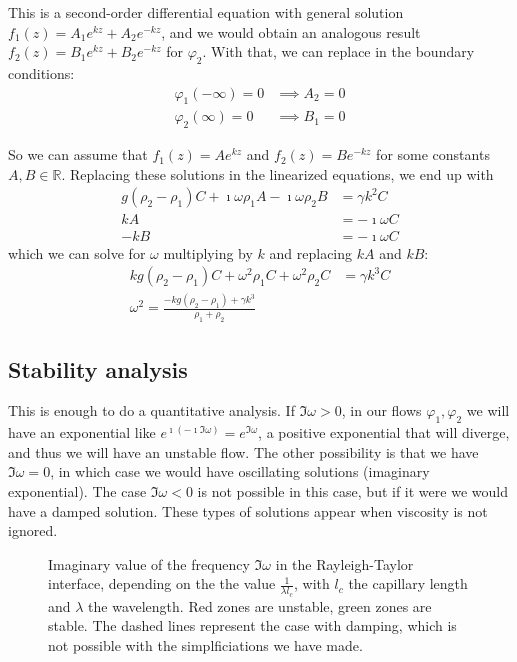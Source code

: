 \documentclass[palatino]{epflnotes}
\begin{document}
This is a second-order differential equation with general solution $f_1(z) = A_1 e^{kz} + A_2 e^{-kz}$, and we would obtain an analogous result $f_2(z) = B_1 e^{kz} + B_2e^{-kz}$ for $φ_2$. With that, we can replace in the boundary conditions:
\begin{align}
φ_1(-∞) = 0 &\implies A_2 = 0  \label{eq:RayleighTaylor:AppliedBoundary1} \\
φ_2(∞) = 0 &\implies B_1 = 0 \label{eq:RayleighTaylor:AppliedBoundary2}
\end{align}

So we can assume that $f_1(z) = Ae^{kz}$ and $f_2(z) = Be^{-kz}$ for some constants $A, B ∈ ℝ$. Replacing these solutions in the linearized equations, we end up with \begin{align*}
g(ρ_2 - ρ_1)C + \imath ωρ_1A - \imath ω ρ_2 B &= γk^2 C \\
kA &= -\imath ω C \\
- kB &= -\imath ω C
\end{align*} which we can solve for $ω$ multiplying by $k$ and replacing $k A$ and $kB$:
\begin{align}
kg(ρ_2 - ρ_1)C + ω^2 ρ_1 C + ω^2 ρ_2 C &= γk^3 C \nonumber \\
ω^2 =\frac{-kg(ρ_2 - ρ_1) + γk^3 }{ρ_1 + ρ_2}
\end{align}

\subsection{Stability analysis}

This is enough to do a quantitative analysis. If $\Im ω > 0$, in our flows $φ_1, φ_2$ we will have an exponential like $e^{\imath (- \imath \Im ω)} = e^{\Im ω}$, a positive exponential that will diverge, and thus we will have an unstable flow. The other possibility is that we have $\Im ω = 0$, in which case we would have oscillating solutions (imaginary exponential). The case $\Im ω < 0$ is not possible in this case, but if it were we would have a damped solution. These types of solutions appear when viscosity is not ignored.

\begin{figure}[hbtp]
\caption{Imaginary value of the frequency $\Im ω$ in the Rayleigh-Taylor interface, depending on the the value $\frac{1}{λl_c}$, with $l_c$ the capillary length and $λ$ the wavelength. Red zones are unstable, green zones are stable. The dashed lines represent the case with damping, which is not possible with the simplficiations we have made.}
\label{fig:RayleighTaylor:Stability}
\end{figure}
\end{document}
